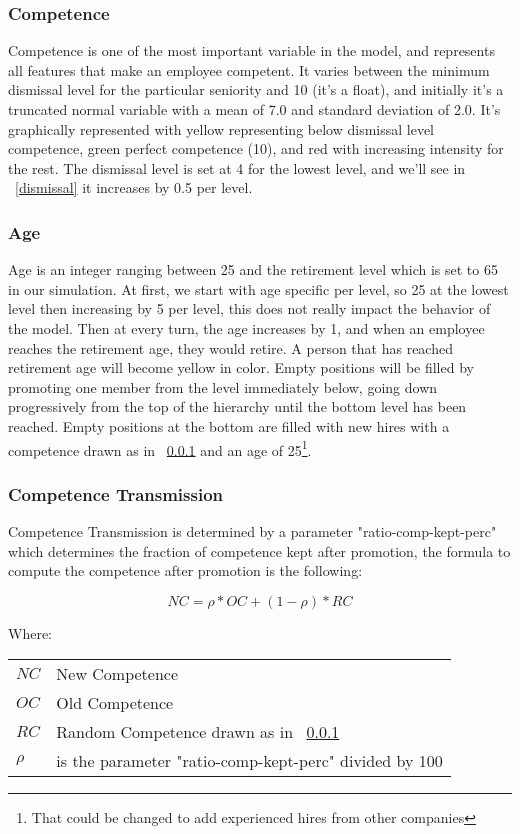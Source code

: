 \documentclass[11pt]{article}
\begin{document}
\subsubsection{Competence}
\label{stcompetence}
Competence is one of the most important variable in the model, and represents all features that make an employee competent. It varies between the minimum dismissal level for the particular seniority and 10 (it's a float), and initially it's a truncated normal variable with a mean of 7.0 and standard deviation of 2.0. It's graphically represented with yellow representing below dismissal level competence, green perfect competence (10), and red with increasing intensity for the rest. The dismissal level is set at 4 for the lowest level, and we'll see in ~\ref{dismissal} it increases by 0.5 per level.

\subsubsection{Age}
Age is an integer ranging between 25 and the retirement level which is set to 65 in our simulation. At first, we start with age specific per level, so 25 at the lowest level then increasing by 5 per level, this does not really impact the behavior of the model. Then at every turn, the age increases by 1, and when an employee reaches the retirement age, they would retire. A person that has reached retirement age will become yellow in color. Empty positions will be filled by promoting one member from the level immediately below, going down progressively from the top of the hierarchy until the bottom level has been reached. Empty positions at the bottom are filled with new hires with a competence drawn as in ~\ref{stcompetence} and an age of 25\footnote{That could be changed to add experienced hires from other companies}.

\subsubsection{Competence Transmission}
Competence Transmission is determined by a parameter "ratio-comp-kept-perc" which determines the fraction of competence kept after promotion, the formula to compute the competence after promotion is the following:

\begin{equation}
NC = \rho * OC + (1 - \rho) * RC
\end{equation}

Where:

\begin{tabular}{l l}
$NC$     & New Competence \\
$OC$     & Old Competence \\
$RC$     & Random Competence drawn as in ~\ref{stcompetence} \\
$\rho$ & is the parameter "ratio-comp-kept-perc" divided by 100 \\
\end{tabular}
\end{document}
